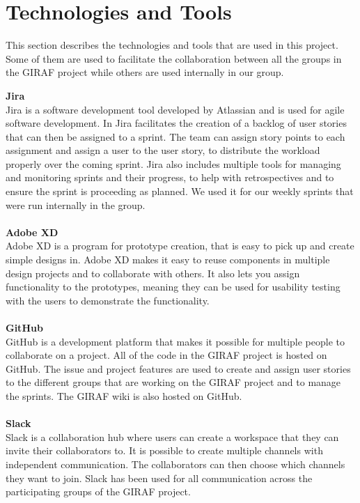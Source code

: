 \section{Technologies and Tools}
This section describes the technologies and tools that are used in this project. 
Some of them are used to facilitate the collaboration between all the groups in the GIRAF project while others are used internally in our group.

\textbf{Jira}\\
Jira is a software development tool developed by Atlassian and is used for agile software development.
In Jira facilitates the creation of a backlog of user stories that can then be assigned to a sprint.
The team can assign story points to each assignment and assign a user to the user story, to distribute the workload properly over the coming sprint.
Jira also includes multiple tools for managing and monitoring sprints and their progress, to help with retrospectives and to ensure the sprint is proceeding as planned.
We used it for our weekly sprints that were run internally in the group.
\\\\
\textbf{Adobe XD}\\
Adobe XD is a program for prototype creation, that is easy to pick up and create simple designs in.
Adobe XD makes it easy to reuse components in multiple design projects and to collaborate with others.
It also lets you assign functionality to the prototypes, meaning they can be used for usability testing with the users to demonstrate the functionality.
\\\\
\textbf{GitHub}\\
GitHub is a development platform that makes it possible for multiple people to collaborate on a project. 
All of the code in the GIRAF project is hosted on GitHub.
The issue and project features are used to create and assign user stories to the different groups that are working on the GIRAF project and to manage the sprints. 
The GIRAF wiki is also hosted on GitHub.
\\\\
\textbf{Slack}\\
Slack is a collaboration hub where users can create a workspace that they can invite their collaborators to.
It is possible to create multiple channels with independent communication. 
The collaborators can then choose which channels they want to join.
Slack has been used for all communication across the participating groups of the GIRAF project.

